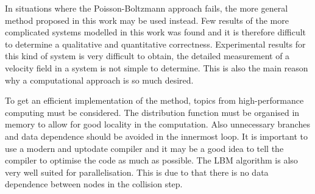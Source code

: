 In situations where the Poisson-Boltzmann approach fails, the more
general method proposed in this work may be used instead. Few results
of the more complicated systems modelled in this work was found and it
is therefore difficult to determine a qualitative and quantitative
correctness. Experimental results for this kind of system is very
difficult to obtain, the detailed measurement of a velocity
field in a system is not simple to determine. This is also the main
reason why a computational approach is so much desired.

To get an efficient implementation of the method, topics from
high-performance computing must be considered. The distribution
function must be organised in memory to allow for good locality in the
computation. Also unnecessary branches and data dependence should be
avoided in the innermost loop. It is important to use a modern and
uptodate compiler and it may be a good idea to tell the compiler to
optimise the code as much as possible. The LBM algorithm is also very
well suited for parallelisation. This is due to that there is no data
dependence between nodes in the collision step.
